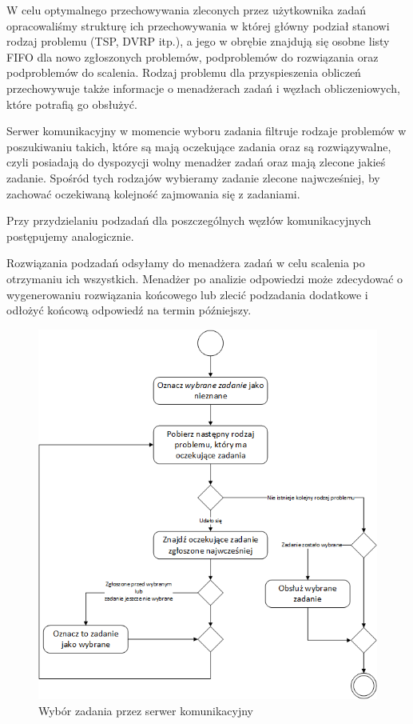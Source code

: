 \documentclass[12pt,a4paper,titlepage]{report}
\begin{document}
	W celu optymalnego przechowywania zleconych przez użytkownika zadań opracowaliśmy
	strukturę ich przechowywania w której główny podział stanowi rodzaj problemu
	(TSP, DVRP itp.), a jego w obrębie znajdują się osobne listy FIFO dla nowo zgłoszonych problemów,
	podproblemów do rozwiązania oraz podproblemów do scalenia. Rodzaj problemu dla przyspieszenia obliczeń
	przechowywuje także informacje o menadżerach zadań i węzłach obliczeniowych, które potrafią
	go obsłużyć. 
	
	Serwer komunikacyjny w momencie wyboru zadania filtruje rodzaje problemów w poszukiwaniu takich,
	które są mają oczekujące zadania oraz są rozwiązywalne, czyli posiadają do dyspozycji wolny menadżer zadań 
	oraz mają zlecone jakieś zadanie. Spośród tych rodzajów wybieramy zadanie zlecone najwcześniej, by zachować
	oczekiwaną kolejność zajmowania się z zadaniami.
	
	Przy przydzielaniu podzadań dla poszczególnych węzłów komunikacyjnych postępujemy analogicznie.
	
	Rozwiązania podzadań odsyłamy do menadżera zadań w celu scalenia po otrzymaniu ich wszystkich. Menadżer
	po analizie odpowiedzi może zdecydować o wygenerowaniu rozwiązania końcowego lub zlecić podzadania dodatkowe
	i odłożyć końcową odpowiedź na termin późniejszy. 
	
	\begin{figure}[h]
		\centering
		\caption{Wybór zadania przez serwer komunikacyjny}
		\includegraphics[width=\textwidth]{img/CommunicationServer-SelectTask.png}
	\end{figure}
	
\end{document}
